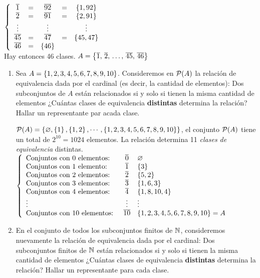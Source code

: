 \documentclass[12pt,a4paper, spanish]{article}
\begin{document}
\begin{enumerate}[label=\roman*)]
\begin{minipage}{0.7\textwidth}
		      $\llave{ccccc}{
				      \clase{1} & = & \clase{92} & = & \set{1, 92}\\
				      \clase{2} & = & \clase{91} & = & \set{2, 91}\\
				      \vdots  &   & \vdots   &   & \vdots\\
				      \clase{45} & = & \clase{47} & = & \set{45, 47}\\
				      \clase{46} & = & \set{46}
			      }$\\
		      Hay entonces 46 clases. $A = \set{\clase{1},\, \clase{2},\, \dots,\, \clase{45},\, \clase{46}}$
	      \end{minipage}
\end{enumerate}

\ejercicio
\begin{enumerate}[label=\roman*)]
	\item
	      Sea $A = \set{1, 2, 3, 4, 5, 6, 7, 8, 9, 10}$. Consideremos en $\partes(A)$ la relación de equivalencia dada
	      por el cardinal (es decir, la cantidad de elementos): Dos subconjuntos de $A$ están relacionados si y solo si tienen la misma cantidad
	      de elementos ¿Cuántas clases de equivalencia \textbf{distintas} determina la relación? Hallar un representante par acada clase.\\

	      \separadorCorto

	      $\partes(A) = \set{\vacio, \set{1}, \set{1,2}, \cdots, \set{1, 2, 3, 4, 5, 6, 7, 8, 9, 10}}$, el conjunto $\partes(A)$ tiene un total de
	      $2^{10} = 1024$ elementos. La relación determina 11 \textit{clases de equivalencia} distintas.\\
	      $\llave{lcl}{
			      \text{Conjuntos con 0 elementos: } & \clase{0}  & \vacio\\
			      \text{Conjuntos con 1 elemento: } & \clase{1} & \set{3}\\
			      \text{Conjuntos con 2 elementos: }& \clase{2} & \set{5,2}\\
			      \text{Conjuntos con 3 elementos: }& \clase{3} & \set{1,6, 3}\\
			      \text{Conjuntos con 4 elementos: }& \clase{4} & \set{1,8, 10,4}\\
			      \vdots                            &\vdots  & \vdots\\
			      \text{Conjuntos con 10 elementos: } & \clase{10} & \set{1,2,3,4,5,6,7,8,9,10} = A\\
		      }$

	\item
	      En el conjunto de todos los subconjuntos finitos de $\naturales$, consideremos nuevamente la relación de equivalencia dada por el cardinal: Dos subconjuntos finitos
	      de $\naturales$ están relacionados si y solo si tienen la misma cantidad de elementos ¿Cuántas clases de equivalencia \textbf{distintas} determina la relación?
	      Hallar un representante para cada clase.\\


\end{enumerate}
\end{document}
